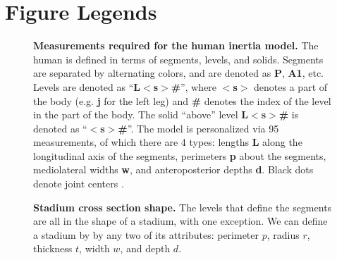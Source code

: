 \documentclass[10pt]{article}
\begin{document}
\section*{Figure Legends}

\begin{figure}[!ht]
\begin{center}
\end{center}
\caption{
{\bf Measurements required for the human inertia model.}  The human is defined
in terms of segments, levels, and solids. Segments are separated by alternating colors, and are denoted as \textbf{P},
\textbf{A1}, etc. Levels are denoted as ``\textbf{L$<$s$>$\#}'', where \textbf{$<$s$>$}
denotes a part of the body (e.g. \textbf{j} for the left leg) and \textbf{\#}
denotes the index of the level in the part of the body. The solid ``above''
level \textbf{L$<$s$>$\#} is denoted as ``\textbf{$<$s$>$\#}''. The model is
personalized via 95 measurements, of which there are 4 types: lengths
\textbf{L} along the longitudinal axis of the segments, perimeters \textbf{p}
about the segments, mediolateral widths \textbf{w}, and anteroposterior depths
\textbf{d}. Black dots denote joint centers \cite{Yeadon1990c}.
}
\label{fig:meas}
\end{figure}

\begin{figure}[!ht]
\begin{center}
\end{center}
\caption{
{\bf Stadium cross section shape.}  The levels that define the segments are all
in the shape of a stadium, with one exception. We can define a stadium by
by any two of its attributes: perimeter $p$, radius $r$, thickness $t$,  width
$w$, and depth $d$.
}
\label{fig:stadium}
\end{figure}
\end{document}
